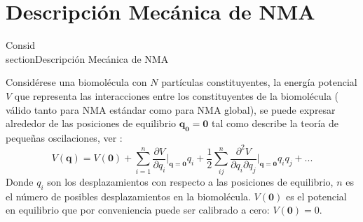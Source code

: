\section{Descripci\'{o}n Mec\'{a}nica de NMA}

Consid\\section{Descripci\'{o}n Mec\'{a}nica de NMA}

Consid\'{e}rese una biomol\'{e}cula con $N$ part\'{i}culas constituyentes, la energ\'{i}a potencial $V$ que representa las interacciones entre los constituyentes de la biomol\'{e}cula ( v\'{a}lido tanto para NMA est\'{a}ndar como para NMA global), se puede expresar alrededor de las posiciones de equilibrio $\mathbf{q_0}=\mathbf{0}$ tal como describe la teor\'{i}a de peque\~{n}as oscilaciones, ver \cite{Goldstein2001}:
\begin{equation}\label{eq:1}
V(\mathbf{q})=V(\mathbf{0})+\sum_{i=1}^n\frac{\partial V}{\partial q_i}\bigg|_{\mathbf{q}=\mathbf{0}}q_i+\frac{1}{2}\sum_{ij}^{n}\frac{\partial^2 V }{\partial q_i\partial q_j}\bigg|_{\mathbf{q}=\mathbf{0}}q_i q_j+...
\end{equation}
Donde $q_i$ son los desplazamientos con respecto a las posiciones de equilibrio, $n$ es el n\'{u}mero de posibles desplazamientos en la biomol\'{e}cula. $V(\mathbf{0})$ es el potencial en equilibrio que por conveniencia puede ser calibrado a cero: $V(\mathbf{0})=0$. \\


